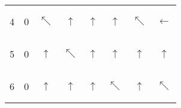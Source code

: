 \begin{figure}[!h]
{\begin{tabular}{cccccccc}
\multicolumn{1}{c|}{4} & \multicolumn{1}{c|}{0} & \multicolumn{1}{c|}{\begin{tiny}$\nwarrow$\end{tiny}} & \multicolumn{1}{c|}{\begin{tiny}$\uparrow$\end{tiny}} & \multicolumn{1}{c|}{\begin{tiny}$\uparrow$\end{tiny}} & \multicolumn{1}{c|}{\begin{tiny}$\uparrow$\end{tiny}} & \multicolumn{1}{c|}{\begin{tiny}$\nwarrow$\end{tiny}} & \multicolumn{1}{c|}{\begin{tiny}$\leftarrow$\end{tiny}} \\ \cline{2-8}
\multicolumn{1}{c|}{5} & \multicolumn{1}{c|}{0} & \multicolumn{1}{c|}{\begin{tiny}$\uparrow$\end{tiny}} & \multicolumn{1}{c|}{\begin{tiny}$\nwarrow$\end{tiny}} & \multicolumn{1}{c|}{\begin{tiny}$\uparrow$\end{tiny}} & \multicolumn{1}{c|}{\begin{tiny}$\uparrow$\end{tiny}} & \multicolumn{1}{c|}{\begin{tiny}$\uparrow$\end{tiny}} & \multicolumn{1}{c|}{\begin{tiny}$\uparrow$\end{tiny}} \\ \cline{2-8}
\multicolumn{1}{c|}{6} & \multicolumn{1}{c|}{0} & \multicolumn{1}{c|}{\begin{tiny}$\uparrow$\end{tiny}} & \multicolumn{1}{c|}{\begin{tiny}$\uparrow$\end{tiny}} & \multicolumn{1}{c|}{\begin{tiny}$\uparrow$\end{tiny}} & \multicolumn{1}{c|}{\begin{tiny}$\nwarrow$\end{tiny}} & \multicolumn{1}{c|}{\begin{tiny}$\uparrow$\end{tiny}} & \multicolumn{1}{c|}{\begin{tiny}$\nwarrow$\end{tiny}} \\ \cline{2-8}

\end{tabular}}
\end{figure}
